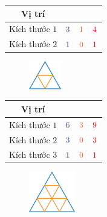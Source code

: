 \begin{multicols}{2}
	\begin{table}[H]
		\setlength{\tabcolsep}{2pt}
		\renewcommand{\arraystretch}{1.3}
		\begin{tabular}{|c|c|c|c|}
			\hline
			Vị trí & {\color{timhieukhoahoc}{Lên}}  & {\color{duongvaotoanhoc}{Xuống}} & {\color{red}{Tổng}}\\
			\hline
			Kích thước $1$ & ${\color{timhieukhoahoc}{3}}$ &${\color{duongvaotoanhoc}{1}}$ & ${\color{red}{4}}$\\
			\hline
			Kích thước $2$ & ${\color{timhieukhoahoc}{1}}$ & ${\color{duongvaotoanhoc}{0}}$ & ${\color{red}{1}}$ \\
			\hline
		\end{tabular}
	\end{table}
	\begin{figure}[H]
		\vspace*{-5pt}
		\centering
		\captionsetup{labelformat= empty, justification=centering}
		\includegraphics[width=0.125\textwidth]{Hinh23_1}
		\caption{}
		\vspace*{-5pt}
	\end{figure}
\end{multicols}
\begin{multicols}{2}
	\begin{table}[H]
		\setlength{\tabcolsep}{2pt}
		\renewcommand{\arraystretch}{1.3}
		\begin{tabular}{|c|c|c|c|}
			\hline
			Vị trí & {\color{timhieukhoahoc}{Lên}}  & {\color{duongvaotoanhoc}{Xuống}} & {\color{red}{Tổng}}\\
			\hline
			Kích thước $1$  & ${\color{timhieukhoahoc}{6}}$ &${\color{duongvaotoanhoc}{ 3}}$ &${\color{red}{9}}$ \\
			\hline
			Kích thước $2$  & ${\color{timhieukhoahoc}{3}}$ & ${\color{duongvaotoanhoc}{0}}$ & ${\color{red}{3}}$ \\
			\hline
			Kích thước $3$  & ${\color{timhieukhoahoc}{1}}$ & ${\color{duongvaotoanhoc}{0}}$ & ${\color{red}{1}}$ \\
			\hline
		\end{tabular}
	\end{table}
	\begin{figure}[H]
		\centering
		\captionsetup{labelformat= empty, justification=centering}
		\includegraphics[width=0.18\textwidth]{Hinh24_1}
		\caption{}
		\vspace*{-10pt}
	\end{figure}
\end{multicols}
